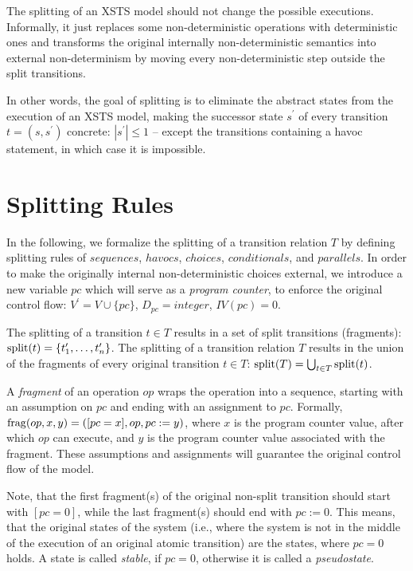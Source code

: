 The splitting of an XSTS model should not change the possible executions. Informally, it just replaces some non-deterministic operations with deterministic ones and transforms the original internally non-deterministic semantics into external non-determinism by moving every non-deterministic step outside the split transitions.

In other words, the goal of splitting is to eliminate the abstract states from the execution of an XSTS model, making the successor state $s^\prime$ of every transition $t=(s,s^\prime)$ concrete: $|s^\prime| \leq 1$ -- except the transitions containing a havoc statement, in which case it is impossible.

\section{Splitting Rules}\label{sec:splitting-rules}

In the following, we formalize the splitting of a transition relation $T$ by defining splitting rules of $sequences$, $havocs$, $choices$, $conditionals$, and $parallels$. In order to make the originally internal non-deterministic choices external, we introduce a new variable $pc$ which will serve as a \textit{program counter}, to enforce the original control flow: $V^\prime = V \cup \{ pc \}$, $D_{pc} = integer$, $IV(pc) = 0$.

The splitting of a transition $t \in T$ results in a set of split transitions (fragments): $\mathrm{split}(t) = \{ t^\prime_1, \ldots, t^\prime_n \}$. The splitting of a transition relation $T$ results in the union of the fragments of every original transition $t \in T$: $\mathrm{split}(T) = \bigcup_{t \in T} \mathrm{split}(t)$.

\begin{definition}[Fragment]
A \textit{fragment} of an operation $op$ wraps the operation into a sequence, starting with an assumption on $pc$ and ending with an assignment to $pc$. Formally, $\mathrm{frag}(op, x, y) = ([pc = x], op, pc := y)$, where $x$ is the program counter value, after which $op$ can execute, and $y$ is the program counter value associated with the fragment. These assumptions and assignments will guarantee the original control flow of the model.
\end{definition}

Note, that the first fragment(s) of the original non-split transition should start with $[pc = 0]$, while the last fragment(s) should end with $pc := 0$. This means, that the original states of the system (i.e., where the system is not in the middle of the execution of an original atomic transition) are the states, where $pc = 0$ holds. A state is called \textit{stable}, if $pc = 0$, otherwise it is called a \textit{pseudostate}.

